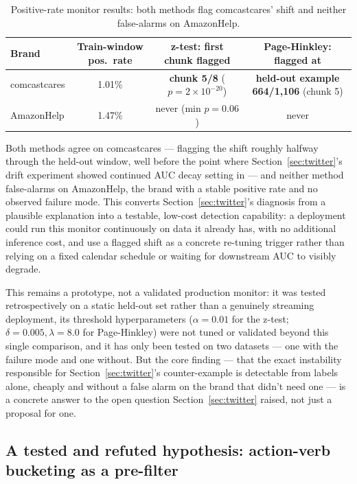 \documentclass[11pt]{article}
\newenvironment{fittab}{\begin{lrbox}{\fittabbox}}{\end{lrbox}%
  \ifdim\wd\fittabbox>\linewidth\resizebox{\linewidth}{!}{\usebox{\fittabbox}}\else\usebox{\fittabbox}\fi}
\begin{document}
\begin{table}[h]
\centering
\small
\begin{fittab}\begin{tabular}{@{}lccc@{}}
\toprule
\textbf{Brand} & \textbf{Train-window pos.\ rate} & \textbf{z-test: first chunk flagged} & \textbf{Page-Hinkley: flagged at} \\
\midrule
comcastcares & 1.01\% & \textbf{chunk 5/8} ($p = 2\times10^{-20}$) & \textbf{held-out example 664/1{,}106} (chunk 5) \\
AmazonHelp & 1.47\% & never (min $p = 0.06$) & never \\
\bottomrule
\end{tabular}\end{fittab}
\caption{Positive-rate monitor results: both methods flag comcastcares' shift and neither false-alarms on AmazonHelp.}
\end{table}

Both methods agree on comcastcares --- flagging the shift roughly halfway through the held-out window, well before the point where Section~\ref{sec:twitter}'s drift experiment showed continued AUC decay setting in --- and neither method false-alarms on AmazonHelp, the brand with a stable positive rate and no observed failure mode. This converts Section~\ref{sec:twitter}'s diagnosis from a plausible explanation into a testable, low-cost detection capability: a deployment could run this monitor continuously on data it already has, with no additional inference cost, and use a flagged shift as a concrete re-tuning trigger rather than relying on a fixed calendar schedule or waiting for downstream AUC to visibly degrade.

This remains a prototype, not a validated production monitor: it was tested retrospectively on a static held-out set rather than a genuinely streaming deployment, its threshold hyperparameters ($\alpha=0.01$ for the z-test; $\delta=0.005, \lambda=8.0$ for Page-Hinkley) were not tuned or validated beyond this single comparison, and it has only been tested on two datasets --- one with the failure mode and one without. But the core finding --- that the exact instability responsible for Section~\ref{sec:twitter}'s counter-example is detectable from labels alone, cheaply and without a false alarm on the brand that didn't need one --- is a concrete answer to the open question Section~\ref{sec:twitter} raised, not just a proposal for one.

\subsection{A tested and refuted hypothesis: action-verb bucketing as a pre-filter}
\label{sec:bucketing}
\end{document}
